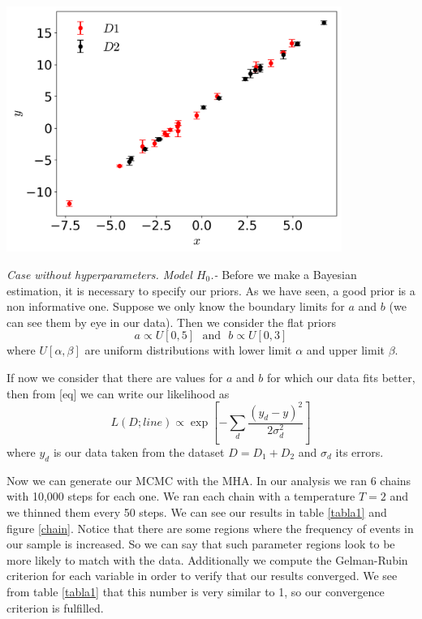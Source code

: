 \documentclass[onecolumn,           %
               showpacs,            %
               preprintnumbers,     %
               aps,                 %
               prl,          	    %
               letterpaper,             %
               superscriptaddress,      %
               nofootinbib,         %
               tightenlines,        %
               floats,floatfix      %
               ,usenatbib,
               ]{revtex4-1}
\begin{document}
\begin{minipage}{\textwidth}
\centering
\includegraphics[height=8cm]{Figures/data_1.png}
\label{data_1}
\end{minipage}


\textit{Case without hyperparameters. Model $H_0$.-} Before we make a Bayesian estimation, it is necessary to specify our priors. As we have seen, a good prior is a non informative one. Suppose we only know the boundary limits for $a$ and $b$ (we can see them by eye in our data). Then we consider the flat priors
\begin{equation}
a \propto U[0,5] \ \ \ \text{and} \ \ \ b \propto U[0,3]
\end{equation}
where $U[\alpha,\beta]$ are uniform distributions with lower limit $\alpha$ and upper limit $\beta$.

If now we consider that there are values for $a$ and $b$ for which our data fits better, then from [eq] we can write our likelihood as
\begin{equation}
L(D;line)\propto \exp\left[-\sum_d \frac{(y_d-y)^2}{2\sigma_d^2}\right]
\end{equation}
where $y_d$ is our data taken from the dataset $D=D_1+D_2$ and $\sigma_d$ its errors.

Now we can generate our MCMC with the MHA. In our analysis we ran 6 chains with 10,000 steps for each one. We ran each chain with a temperature $T=2$ and we thinned them every 50 steps. We can see our results in table \ref{tabla1} and figure \ref{chain}. Notice that there are some regions where the frequency of events in our sample is increased. So we can say that such parameter regions look to be more likely to match with the data. Additionally we compute the Gelman-Rubin criterion for each variable in order to verify that our results converged. We see from table \ref{tabla1} that this number is very similar to 1, so our convergence criterion is fulfilled.
\end{document}
